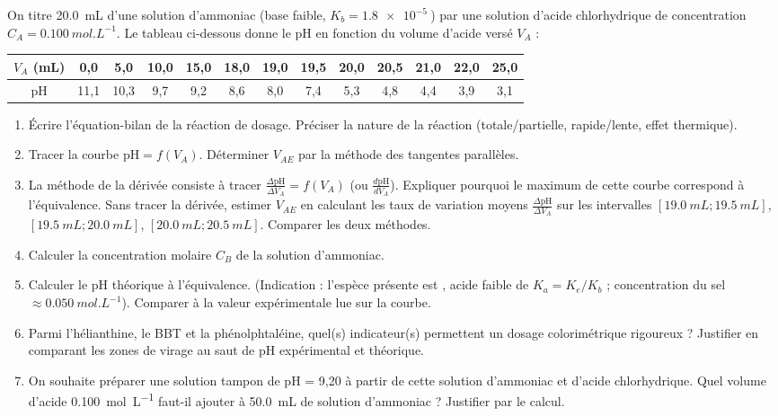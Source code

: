 \documentclass[11pt]{article}
\begin{document}
\begin{exercice}
On titre \SI{20,0}{mL} d'une solution d'ammoniac  (base faible, $K_b = \SI{1,8e-5}{}$) par une solution d'acide chlorhydrique  de concentration $C_A = \SI{0,100}{mol.L^{-1}}$.
Le tableau ci-dessous donne le pH en fonction du volume d'acide versé $V_A$ :
\begin{center}
\begin{tabular}{c|cccccccccccc}
$V_A$ (mL) & 0,0 & 5,0 & 10,0 & 15,0 & 18,0 & 19,0 & 19,5 & 20,0 & 20,5 & 21,0 & 22,0 & 25,0 \\
\hline
pH & 11,1 & 10,3 & 9,7 & 9,2 & 8,6 & 8,0 & 7,4 & 5,3 & 4,8 & 4,4 & 3,9 & 3,1
\end{tabular}
\end{center}
\begin{enumerate}
    \item Écrire l'équation-bilan de la réaction de dosage. Préciser la nature de la réaction (totale/partielle, rapide/lente, effet thermique).
    \item Tracer la courbe $\text{pH} = f(V_A)$. Déterminer $V_{AE}$ par la méthode des tangentes parallèles.
    \item La méthode de la dérivée consiste à tracer $\frac{\Delta \text{pH}}{\Delta V_A} = f(V_A)$ (ou $\frac{d\text{pH}}{dV_A}$). Expliquer pourquoi le maximum de cette courbe correspond à l'équivalence. Sans tracer la dérivée, estimer $V_{AE}$ en calculant les taux de variation moyens $\frac{\Delta \text{pH}}{\Delta V_A}$ sur les intervalles $[\SI{19,0}{mL};\SI{19,5}{mL}]$, $[\SI{19,5}{mL};\SI{20,0}{mL}]$, $[\SI{20,0}{mL};\SI{20,5}{mL}]$. Comparer les deux méthodes.
    \item Calculer la concentration molaire $C_B$ de la solution d'ammoniac.
    \item Calculer le pH théorique à l'équivalence. (Indication : l'espèce présente est , acide faible de $K_a = K_e/K_b$ ; concentration du sel $\approx \SI{0,050}{mol.L^{-1}}$). Comparer à la valeur expérimentale lue sur la courbe.
    \item Parmi l'hélianthine, le BBT et la phénolphtaléine, quel(s) indicateur(s) permettent un dosage colorimétrique rigoureux ? Justifier en comparant les zones de virage au saut de pH expérimental et théorique.
    \item On souhaite préparer une solution tampon de pH = 9,20 à partir de cette solution d'ammoniac et d'acide chlorhydrique. Quel volume d'acide \SI{0,100}{mol.L^{-1}} faut-il ajouter à \SI{50,0}{mL} de solution d'ammoniac ? Justifier par le calcul.
\end{enumerate}
\end{exercice}
\end{document}
